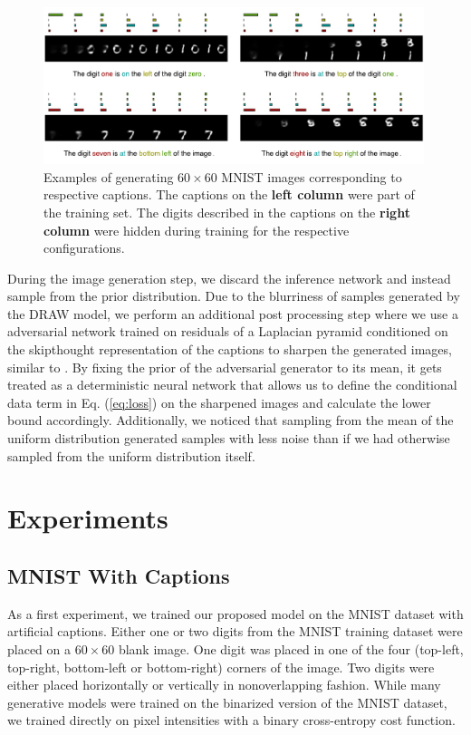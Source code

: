 \documentclass{article} %
\begin{document}
\begin{figure}[!t]
\captionsetup[subfigure]{labelformat=empty}
\begin{center}
\includegraphics[width=0.99\textwidth]{figures/new/mnist/test3.pdf}\quad
%
\end{center}
\caption{Examples of generating $60 \times 60$ MNIST images corresponding to respective captions. The captions on the \textbf{left column} were part of the training set. The digits described in the captions on the \textbf{right column} were hidden during training for the respective configurations.}
\label{fig:figmnist}
\vspace{-0.3cm}
\end{figure}

During the image generation step, we discard the inference network and instead sample from the prior distribution. 
Due to the blurriness of samples generated by the DRAW model, we perform an additional post processing step where we use a 
adversarial network trained on residuals of a Laplacian pyramid conditioned on the skipthought representation \citep{kiros_skipthought} of the captions 
to sharpen the generated images, similar to \citep{denton_lapgan}. By fixing the prior of the adversarial generator to its mean, it gets treated as a deterministic neural network that allows us to define the conditional data term in Eq. (\ref{eq:loss}) on the sharpened images and calculate the lower bound accordingly. Additionally, we noticed that sampling from the mean of the uniform distribution generated samples with less noise than if we had otherwise sampled from the uniform distribution itself.  

\section{Experiments}
\subsection{MNIST With Captions}
As a first experiment, we trained our proposed model on the MNIST dataset with artificial captions. Either one or two digits from the MNIST training dataset were placed on a $60 \times 60$ blank image. One digit was placed in one of the four (top-left, top-right, bottom-left or bottom-right) corners of the image. Two digits were either placed horizontally or vertically in nonoverlapping fashion. 
While many generative models were trained on the binarized version of the MNIST dataset, we trained directly on pixel intensities with a binary cross-entropy cost function.
\end{document}
